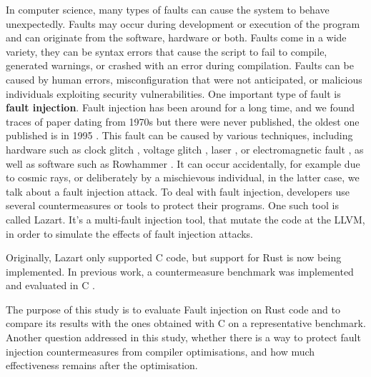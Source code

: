In computer science, many types of faults can cause the system to behave unexpectedly.
Faults may occur during development or execution of the program and can originate from the software, hardware or both.
Faults come in a wide variety, they can be syntax errors that cause the script to fail to compile, generated warnings, or crashed with an error during compilation.
Faults can be caused by human errors, misconfiguration that were not anticipated, or malicious individuals exploiting security vulnerabilities.
One important type of fault is \textbf{fault injection}.
Fault injection has been around for a long time, and we found traces of paper dating from 1970s but there were never published, the oldest one published is in 1995 \cite{1_Segall1995}.
This fault can be caused by various techniques, including hardware such as clock glitch \cite{15obermaier2017fuzzy,16korak2014effects}, voltage glitch \cite{11zussa2012investigation, 12zussa2014analysis, 13selmane2011security}, laser \cite{17selmke2016precise, 18dutertre2018laser}, or electromagnetic fault \cite{19dehbaoui2012injection, 20dehbaoui2012electromagnetic}, as well as software such as Rowhammer \cite{14kim2014flipping}.
It can occur accidentally, for example due to cosmic rays, or deliberately by a mischievous individual, in the latter case, we talk about a fault injection attack.
To deal with fault injection, developers use several countermeasures \cite{dureuil2016,liu2025,Richter-Brockmann2021} or tools \cite{Arlat1990,Arribas2020,1_Segall1995,pensec2024} to protect their programs.
One such tool is called Lazart\cite{Lazart2015}. It's a multi-fault injection tool, that mutate the code at the LLVM, in order to simulate the effects of fault injection attacks.

Originally, Lazart only supported C code, but support for Rust is now being implemented. 
In previous work, a countermeasure benchmark was implemented and evaluated in C \cite{dureuil2016}.

The purpose of this study is to evaluate Fault injection on Rust code and to compare its results with the ones obtained with C on a representative benchmark.
Another question addressed in this study, whether there is a way to protect fault injection countermeasures from compiler optimisations, and how much effectiveness remains after the optimisation.